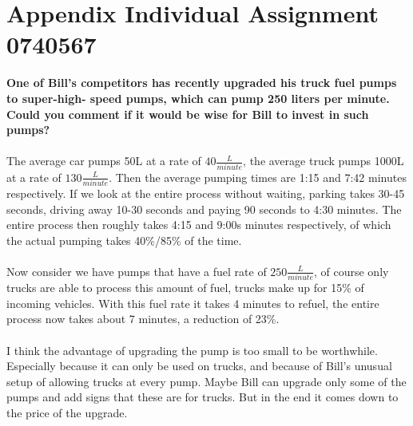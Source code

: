 \section{Appendix Individual Assignment 0740567}\label{app:indivnicky}
\textbf{One of Bill’s competitors has recently upgraded his truck fuel pumps to super-high- speed pumps, which can pump 250 liters per minute. Could you comment if it would be wise for Bill to invest in such pumps?}\\
\\
The average car pumps 50L at a rate of $40\frac{L}{minute}$, the average truck pumps 1000L at a rate of $130\frac{L}{minute}$. Then the average pumping times are 1:15 and 7:42 minutes respectively. If we look at the entire process without waiting, parking takes 30-45 seconds, driving away 10-30 seconds and paying 90 seconds to 4:30 minutes. The entire process then roughly takes 4:15 and 9:00s minutes respectively, of which the actual pumping takes 40\%/85\% of the time.\\
\\
Now consider we have pumps that have a fuel rate of $250\frac{L}{minute}$, of course only trucks are able to process this amount of fuel, trucks make up for 15\% of incoming vehicles. With this fuel rate it takes 4 minutes to refuel, the entire process now takes about 7 minutes, a reduction of 23\%.\\
\\
I think the advantage of upgrading the pump is too small to be worthwhile. Especially because it can only be used on trucks, and because of Bill's unusual setup of allowing trucks at every pump. Maybe Bill can upgrade only some of the pumps and add signs that these are for trucks. But in the end it comes down to the price of the upgrade.
